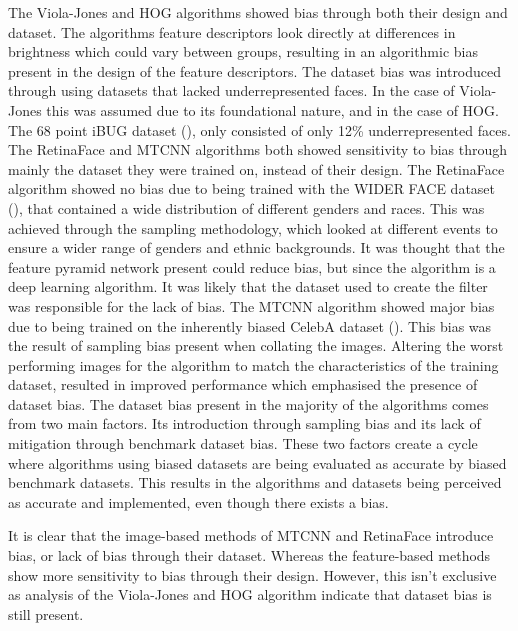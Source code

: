 \documentclass{l4proj}
\begin{document}
The Viola-Jones and HOG algorithms showed bias through both their design and dataset. The algorithms feature descriptors look directly at differences in brightness which could vary between groups, resulting in an algorithmic bias present in the design of the feature descriptors. The dataset bias was introduced through using datasets that lacked underrepresented faces. In the case of Viola-Jones this was assumed due to its foundational nature, and in the case of HOG. The 68 point iBUG dataset (\cite{300w}), only consisted of only 12\% underrepresented faces. The RetinaFace and MTCNN algorithms both showed sensitivity to bias through mainly the dataset they were trained on, instead of their design. The RetinaFace algorithm showed no bias due to being trained with the WIDER FACE dataset (\cite{widerface}), that contained a wide distribution of different genders and races. This was achieved through the sampling methodology, which looked at different events to ensure a wider range of genders and ethnic backgrounds. It was thought that the feature pyramid network present could reduce bias, but since the algorithm is a deep learning algorithm. It was likely that the dataset used to create the filter was responsible for the lack of bias. The MTCNN algorithm showed major bias due to being trained on the inherently biased CelebA dataset (\cite{celeba}). This bias was the result of sampling bias present when collating the images. Altering the worst performing images for the algorithm to match the characteristics of the training dataset, resulted in improved performance which emphasised the presence of dataset bias. The dataset bias present in the majority of the algorithms comes from two main factors. Its introduction through sampling bias and its lack of mitigation through benchmark dataset bias. These two factors create a cycle where algorithms using biased datasets are being evaluated as accurate by biased benchmark datasets. This results in the algorithms and datasets being perceived as accurate and implemented, even though there exists a bias.

It is clear that the image-based methods of MTCNN and RetinaFace introduce bias, or lack of bias through their dataset. Whereas the feature-based methods show more sensitivity to bias through their design. However, this isn't exclusive as analysis of the Viola-Jones and HOG algorithm indicate that dataset bias is still present.
\end{document}
